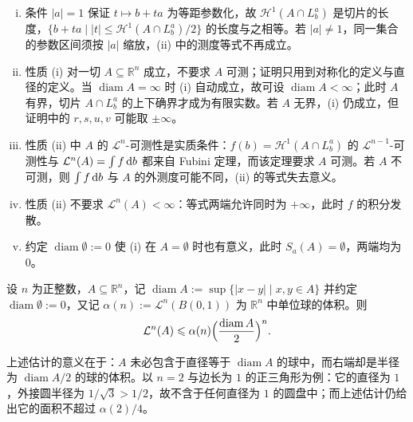 \documentclass[../../main.tex]{subfiles}%
\begin{document}
\begin{remark}\label{remark:ch02-thm-2-3-条件}
\begin{enumerate}[(i)]
\item 条件 $|a|=1$ 保证 $t\mapsto b+ta$ 为等距参数化，故 $\mathcal{H}^1(A\cap L_b^a)$ 是切片的长度，$\{b+ta\mid |t|\leqslant\mathcal{H}^1(A\cap L_b^a)/2\}$ 的长度与之相等。若 $|a|\neq1$，同一集合的参数区间须按 $|a|$ 缩放，(ii) 中的测度等式不再成立。
\item 性质 (i) 对一切 $A\subseteq\mathbb{R}^n$ 成立，不要求 $A$ 可测；证明只用到对称化的定义与直径的定义。当 $\operatorname{diam}A=\infty$ 时 (i) 自动成立，故可设 $\operatorname{diam}A<\infty$；此时 $A$ 有界，切片 $A\cap L_b^a$ 的上下确界才成为有限实数。若 $A$ 无界，(i) 仍成立，但证明中的 $r,s,u,v$ 可能取 $\pm\infty$。
\item 性质 (ii) 中 $A$ 的 $\mathcal{L}^n$-可测性是实质条件：$f(b)=\mathcal{H}^1(A\cap L_b^a)$ 的 $\mathcal{L}^{n-1}$-可测性与 $\mathcal{L}^n(A)=\int f\,\mathrm{d} b$ 都来自 Fubini 定理，而该定理要求 $A$ 可测。若 $A$ 不可测，则 $\int f\,\mathrm{d} b$ 与 $A$ 的外测度可能不同，(ii) 的等式失去意义。
\item 性质 (ii) 不要求 $\mathcal{L}^n(A)<\infty$：等式两端允许同时为 $+\infty$，此时 $f$ 的积分发散。
\item 约定 $\operatorname{diam}\emptyset:=0$ 使 (i) 在 $A=\emptyset$ 时也有意义，此时 $S_a(A)=\emptyset$，两端均为 $0$。
\end{enumerate}
\end{remark}

\begin{theorem}[等直径不等式]\label{theorem:ch02-2-4}
设 $n$ 为正整数，$A\subseteq\mathbb{R}^n$，记 $\operatorname{diam}A:=\sup\{|x-y|\mid x,y\in A\}$ 并约定 $\operatorname{diam}\emptyset:=0$，又记 $\alpha(n):=\mathcal{L}^n(B(0,1))$ 为 $\mathbb{R}^n$ 中单位球的体积。则
\begin{align*}
\mathcal{L}^n(A)\leqslant\alpha(n)\Bigl(\frac{\operatorname{diam}A}{2}\Bigr)^n .
\end{align*}
\end{theorem}

\begin{remark}\label{remark:ch02-thm-2-4-球包含}
上述估计的意义在于：$A$ 未必包含于直径等于 $\operatorname{diam}A$ 的球中，而右端却是半径为 $\operatorname{diam}A/2$ 的球的体积。以 $n=2$ 与边长为 $1$ 的正三角形为例：它的直径为 $1$，外接圆半径为 $1/\sqrt3>1/2$，故不含于任何直径为 $1$ 的圆盘中；而上述估计仍给出它的面积不超过 $\alpha(2)/4$。
\end{remark}
\end{document}
